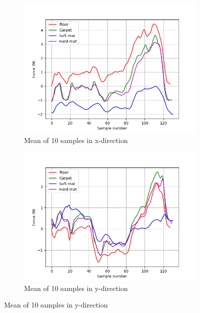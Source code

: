\documentclass[USenglish]{ifimaster}  %
\begin{document}
	\begin{figure} [h]
		\centering
		\begin{subfigure}[b]{0.95\textwidth}
			\includegraphics[width=\textwidth,height=\textheight,keepaspectratio]{Figures/meanx}
			\caption{Mean of 10 samples in x-direction}
			\label{fig:meanx} 
		\end{subfigure}
		
		\begin{subfigure}[b]{0.95\textwidth}
			\includegraphics[width=\textwidth,height=\textheight,keepaspectratio]{Figures/meany}
			\caption{Mean of 10 samples in y-direction}
			\label{fig:meany}
		\end{subfigure}
	\end{figure}
\end{document}
